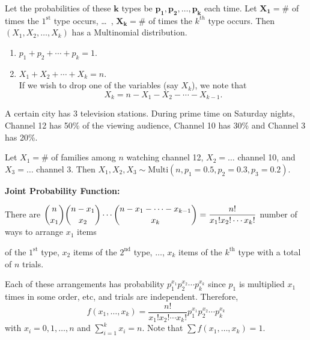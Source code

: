 Let the probabilities of these $\mathbf{k}$ types be $\mathbf{p_1,p_2,\ldots,p_k}$ each time. Let $\mathbf{X_1} = \#$ of times the $1^{\text{st}}$ type occurs, \dots \, , $\mathbf{X_k} = \#$ of times the $k^{th}$ type occurs. Then $\left( X_1,X_2,\ldots,X_k \right)$ has a Multinomial distribution.

\begin{note}
    \phantom{}
    \begin{enumerate}
        \item $p_1 + p_2 + \cdots + p_k = 1$.
        \item $X_1 + X_2 + \cdots + X_k = n$. \\
        If we wish to drop one of the variables (say $X_k$), we note that \vspace{-3mm}
        \[
            X_k = n - X_1 - X_2 - \cdots - X_{k-1}.
        \]
    \end{enumerate}
\end{note}

\begin{example}
    A certain city has 3 television stations. During prime time on Saturday nights, Channel 12 has 50\% of the viewing audience, Channel 10 has 30\% and Channel 3 has 20\%.

    Let $X_1 = \#$ of families among $n$ watching channel 12, $X_2 = \ldots$ channel 10, and $X_3 = \ldots$ channel 3. Then $X_1,X_2,X_3 \sim \text{Multi}(n,p_1 = 0.5,p_2 = 0.3,p_3 = 0.2)$. \\
\end{example}

\textbf{Joint Probability Function:}

There are $\displaystyle \binom{n}{x_1} \binom{n-x_1}{x_2} \cdots \binom{n-x_1 - \cdots - x_{k-1}}{x_k} = \frac{n!}{x_1! x_2! \cdots x_k!}$ number of ways to arrange $x_1$ items

of the $1^{\text{st}}$ type, $x_2$ items of the $2^{\text{nd}}$ type, $\ldots$, $x_k$ items of the $k^{\text{th}}$ type with a total of $n$ trials.

Each of these arrangements has probability $p_1^{x_1}p_2^{x_2} \cdots p_k^{x_k}$ since $p_1$ is multiplied $x_1$ times in some order, etc, and trials are independent. Therefore,
\[
    f(x_1,\ldots ,x_k) = \frac{n!}{x_1! x_2! \cdots x_k!} p_1^{x_1}p_2^{x_2} \cdots p_k^{x_k}
\]
with $x_i = 0,1,\ldots ,n$ and $\displaystyle \sum_{i=1}^{k} x_i = n$.
Note that $\displaystyle \sum f(x_1,\ldots ,x_k) = 1$.

\pagebreak


